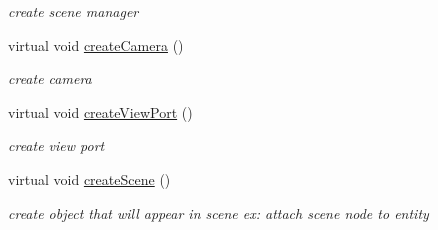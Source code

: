 \begin{DoxyCompactItemize}
\begin{DoxyCompactList}\small\item\em create scene manager \end{DoxyCompactList}\item 
\hypertarget{class_stage_extra_a9d682927b9fa074c084ff1cddbedf4e3}{
virtual void \hyperlink{class_stage_extra_a9d682927b9fa074c084ff1cddbedf4e3}{createCamera} ()}
\label{class_stage_extra_a9d682927b9fa074c084ff1cddbedf4e3}

\begin{DoxyCompactList}\small\item\em create camera \end{DoxyCompactList}\item 
\hypertarget{class_stage_extra_ab30f014cd876c41688ed334a7783b9ba}{
virtual void \hyperlink{class_stage_extra_ab30f014cd876c41688ed334a7783b9ba}{createViewPort} ()}
\label{class_stage_extra_ab30f014cd876c41688ed334a7783b9ba}

\begin{DoxyCompactList}\small\item\em create view port \end{DoxyCompactList}\item 
\hypertarget{class_stage_extra_a856a2571ae3133f8d4330104a80e3dd1}{
virtual void \hyperlink{class_stage_extra_a856a2571ae3133f8d4330104a80e3dd1}{createScene} ()}
\label{class_stage_extra_a856a2571ae3133f8d4330104a80e3dd1}

\begin{DoxyCompactList}\small\item\em create object that will appear in scene ex: attach scene node to entity \end{DoxyCompactList}\end{DoxyCompactItemize}
